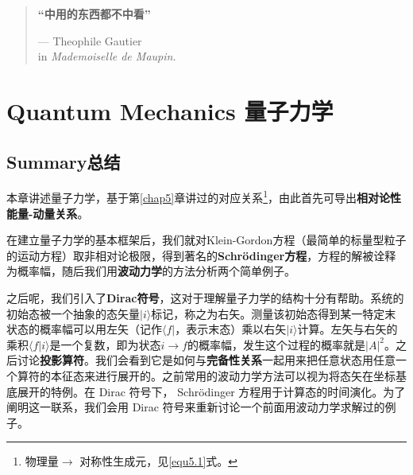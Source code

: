 
\def\pmm{\begin{pmatrix}}
\def\pmme{\end{pmatrix}}


\begin{quote}%
{\bfseries “中用的东西都不中看”}


\begin{flushright}
--- Theophile Gautier\\
in {\itshape Mademoiselle de Maupin.}
\end{flushright}
\end{quote}

\chapter[量子力学]{Quantum Mechanics \quad 量子力学}\label{chap8}

\section*{Summary\quad 总结}
本章讲述量子力学，基于第\ref{chap5}章讲过的对应关系\footnote{物理量$\to$ 对称性生成元，见\eqref{equ5.1}式。}，由此首先可导出{\bfseries 相对论性能量-动量关系}。

在建立量子力学的基本框架后，我们就对Klein-Gordon方程（最简单的标量型粒子的运动方程）取非相对论极限，得到著名的{\bfseries Schr\"{o}dinger方程}，方程的解被诠释为概率幅，随后我们用{\bfseries 波动力学}的方法分析两个简单例子。

之后呢，我们引入了{\bfseries Dirac符号}，这对于理解量子力学的结构十分有帮助。系统的初始态被一个抽象的态矢量$|i\rangle$标记，称之为右矢。测量该初始态得到某一特定末状态的概率幅可以用左矢（记作$\langle f|$，表示末态）乘以右矢$|i \rangle$计算。左矢与右矢的乘积$\langle f | i \rangle$是一个复数，即为状态$i \to f$的概率幅，发生这个过程的概率就是$|A|^2$。之后讨论{\bfseries 投影算符}。我们会看到它是如何与{\bfseries 完备性关系}一起用来把任意状态用任意一个算符的本征态来进行展开的。之前常用的波动力学方法可以视为将态矢在坐标基底展开的特例。在 Dirac 符号下， Schr\"{o}dinger 方程用于计算态的时间演化。为了阐明这一联系，我们会用 Dirac 符号来重新讨论一个前面用波动力学求解过的例子。

